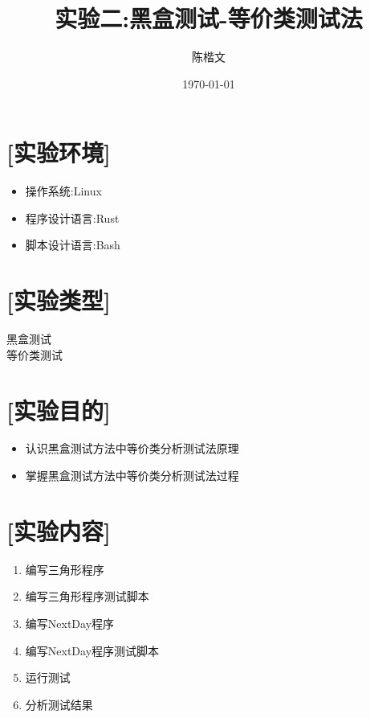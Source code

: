 \documentclass{article}
\begin{document}


\title{实验二:黑盒测试-等价类测试法}
\author{陈楷文}
\date{\today}

\maketitle

\section{[实验环境]}
\begin{itemize}
    \item 操作系统:Linux
    \item 程序设计语言:Rust
    \item 脚本设计语言:Bash
\end{itemize}
\section{[实验类型]}

黑盒测试 \\
等价类测试 \\

\section{[实验目的]}
\begin{itemize}
    \item 认识黑盒测试方法中等价类分析测试法原理
    \item 掌握黑盒测试方法中等价类分析测试法过程
\end{itemize}

\section{[实验内容]}
\begin{enumerate}
    \item 编写三角形程序
    \item 编写三角形程序测试脚本
    \item 编写NextDay程序
    \item 编写NextDay程序测试脚本
    \item 运行测试
    \item 分析测试结果
\end{enumerate}
\end{document}
